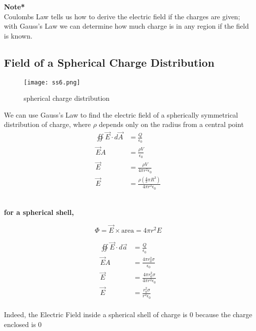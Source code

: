 \documentclass[svgnames]{article}
\begin{document}
\textbf{Note*} \\

Coulombs Law tells us how to derive the electric field if the charges are
given; with Gauss's Law we can determine how much charge is in any region if the field is known. 

\subsection{Field of a Spherical Charge Distribution} 

\vspace{20px}
\begin{figure}[!hb]
  \centering
  \texttt{[image: ss6.png]}
  \caption{spherical charge distribution} 
\end{figure}


\vspace{20px}
We can use Gauss's Law to find the electric field of a spherically symmetrical
distribution of charge, where $\rho$ depends only on the radius from a central point \\


\begin{align*}
\oiint \vec{E} \cdot d\vec{A} &= \frac{Q}{\epsilon_0} \\
\vec{E} A &= \frac{\rho V}{\epsilon_0} \\ 
\vec{E} &= \frac{\rho V}{4 \pi r^2 \epsilon_0} \\
\vec{E} &= \frac{\rho (\frac{4}{3}\pi R^3)}{4 \pi r^2 \epsilon_0}
\end{align*}\\
\begin{center}


\textbf{for a spherical shell,}
\end{center}

\[ \Phi = \vec{E} \times \text{area} = 4\pi r^2 E \] 

\begin{align*} 
\oiint \vec{E} \cdot d\vec{a} &= \frac{Q}{\epsilon_0} \\
\vec{E}A &= \frac{4\pi r_0^2 \sigma}{\epsilon_0} \\ 
\vec{E} &= \frac{4\pi r_0^2 \sigma}{4\pi r^2 \epsilon_0} \\ 
\vec{E} &= \frac{r_0^2 \sigma}{r^2 \epsilon_0}
\end{align*} \\


Indeed, the Electric Field inside a spherical shell of charge is 0 because the charge enclosed is 0 \\
\end{document}
